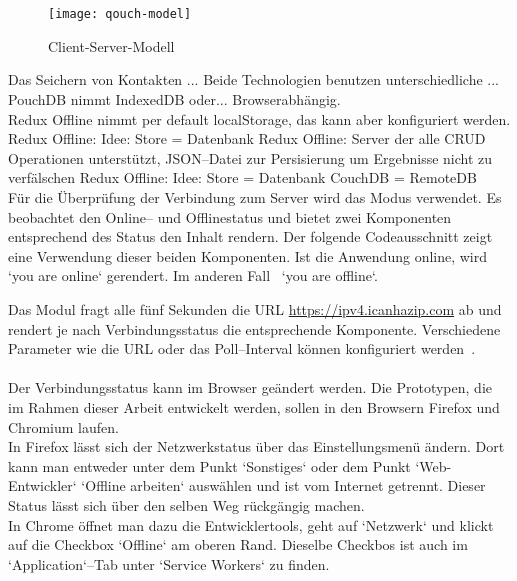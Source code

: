 \\\\
%
% 
%
\begin{figure}[H]
  \centering
  \texttt{[image: qouch-model]}
  \grayRule
  \caption{Client-Server-Modell}
  \label{fig:qouch-model}
\end{figure}
%
%
Das Seichern von Kontakten ...
Beide Technologien benutzen unterschiedliche ... 
PouchDB nimmt IndexedDB oder... Browserabhängig.\\
Redux Offline nimmt per default localStorage, das kann aber konfiguriert werden.
Redux Offline: Idee: Store = Datenbank
%
%
Redux Offline: Server der alle \gls{CRUD} Operationen unterstützt,
\gls{JSON}--Datei zur Persisierung um Ergebnisse nicht zu verfälschen 
Redux Offline: Idee: Store = Datenbank
CouchDB = RemoteDB\\
%
%
Für die Überprüfung der Verbindung zum Server wird das Modus  verwendet. Es beobachtet den Online-- und Offlinestatus und bietet zwei Komponenten entsprechend des Status den Inhalt rendern. Der folgende Codeausschnitt zeigt eine Verwendung dieser beiden Komponenten. Ist die Anwendung online, wird `you are online` gerendert. Im anderen Fall ~`you are offline`.
%
\begin{center}

\end{center}
%
Das Modul fragt alle fünf Sekunden die URL \url{https://ipv4.icanhazip.com} ab und rendert je nach Verbindungsstatus die entsprechende Komponente. Verschiedene Parameter wie die URL oder das Poll--Interval können konfiguriert werden~\cite{react-detect}.\\\\
%
Der Verbindungsstatus kann im Browser geändert werden. Die Prototypen, die im Rahmen dieser Arbeit entwickelt werden, sollen in den Browsern Firefox und Chromium laufen.\\
In Firefox lässt sich der Netzwerkstatus über das Einstellungsmenü ändern. Dort kann man entweder unter dem Punkt `Sonstiges` oder dem Punkt `Web-Entwickler` `Offline arbeiten` auswählen und ist vom Internet getrennt. Dieser Status lässt sich über den selben Weg rückgängig machen.\\
In Chrome öffnet man dazu die Entwicklertools, geht auf `Netzwerk` und klickt auf die Checkbox `Offline` am oberen Rand. Dieselbe Checkbos ist auch im `Application`--Tab unter `Service Workers` zu finden.
%
%
